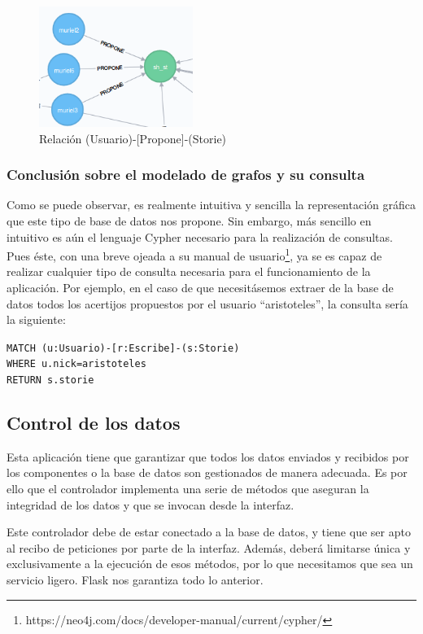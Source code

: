 \begin{figure}[hbtp]
     \centerline{\includegraphics[width=5cm]{figuras/propone.png}}
    \caption{Relación (Usuario)-[Propone]-(Storie)} 
    \label{fig::propone}
\end{figure}

\subsubsection{Conclusión sobre el modelado de grafos y su consulta}

Como se puede observar, es realmente intuitiva y sencilla la representación gráfica que este tipo de base de datos nos propone. Sin embargo, más sencillo  en intuitivo es aún el lenguaje Cypher necesario para la realización de consultas. Pues éste, con una breve ojeada a su manual de usuario\footnote{https://neo4j.com/docs/developer-manual/current/cypher/}, ya se es capaz de realizar cualquier tipo de consulta necesaria para el funcionamiento de la aplicación. Por ejemplo, en el caso de que necesitásemos extraer de la base de datos todos los acertijos propuestos por el usuario ``aristoteles'', la consulta sería la siguiente:
\begin{flushleft}
    \texttt{MATCH (u:Usuario)-[r:Escribe]-(s:Storie)\\ WHERE u.nick=aristoteles\\ RETURN s.storie}

\end{flushleft}

\subsection{Control de los datos}

Esta aplicación tiene que garantizar que todos los datos enviados y recibidos por los componentes o la base de datos son gestionados de manera adecuada. Es por ello que el controlador implementa una serie de métodos  que aseguran la integridad de los datos y que se invocan desde la interfaz.

Este controlador debe de estar conectado a la base de datos, y tiene que ser apto al recibo de peticiones por parte de la interfaz. Además, deberá limitarse única y exclusivamente a la ejecución de esos métodos, por lo que necesitamos que sea un servicio ligero. Flask nos garantiza todo lo anterior.

